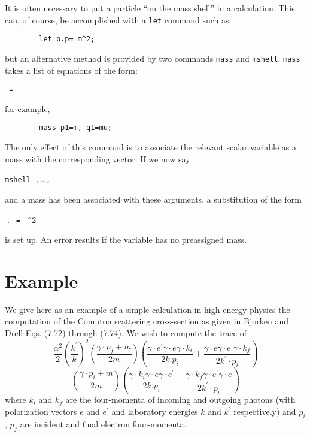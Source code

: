 It is often necessary to put a particle ``on the mass shell'' in a
calculation.  This can, of course, be accomplished with a \texttt{let}
command such as
\begin{verbatim}
        let p.p= m^2;
\end{verbatim}
but an alternative method is provided by two commands \texttt{mass} and
\texttt{mshell}.
\texttt{mass} takes a list of equations of the form:
\begin{syntax}
  \texttt{ = }
\end{syntax}
for example,
\begin{verbatim}
        mass p1=m, q1=mu;
\end{verbatim}
The only effect of this command is to associate the relevant scalar
variable as a mass with the corresponding vector. If we now say
\begin{syntax}
  \texttt{mshell }\texttt{,}\,\dots\texttt{,}\,
\end{syntax}
and a mass has been associated with these arguments, a substitution of the
form
\begin{syntax}
  \,\texttt{.}\,\texttt{ = }%
    \texttt{\textasciicircum}2
\end{syntax}
is set up. An error results if the variable has no preassigned mass.

\section{Example}

We give here as an example of a simple calculation in high energy physics
the computation of the Compton scattering cross-section as given in
Bjorken and Drell Eqs. (7.72) through (7.74). We wish to compute the trace of
\[
\frac{\alpha^2}{2} \left(\frac{k^\prime}{k}\right)^2
 \left(\frac{\gamma\cdot p_f+m}{2m}\right)\left(\frac{\gamma\cdot e^\prime \gamma\cdot e
 \gamma\cdot k_i}{2k.p_i} + \frac{\gamma\cdot e\gamma\cdot e^\prime
 \gamma\cdot k_f}{2k^\prime\cdot p_i}\right)
\]
\[
 \left(\frac{\gamma\cdot p_i+m}{2m}\right)
 \left(\frac{\gamma\cdot k_i\gamma\cdot e\gamma\cdot e^\prime}{2k.p_i} +
 \frac{\gamma\cdot k_f\gamma\cdot e^\prime\gamma\cdot e}{2k^\prime\cdot p_i}
 \right)
\]
where $k_i$ and $k_f$ are the four-momenta of incoming and outgoing photons
(with polarization vectors $e$ and $e^\prime$ and laboratory energies 
$k$ and $k^\prime$
respectively) and $p_i$, $p_f$ are incident and final electron four-momenta.

